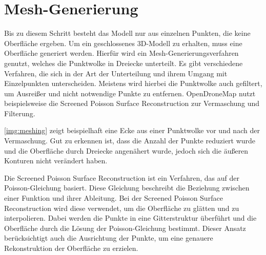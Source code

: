 \documentclass[./00PhotoBox.tex]{subfiles}
\begin{document}
\section{Mesh-Generierung}
Bis zu diesem Schritt besteht das Modell nur aus einzelnen Punkten, die keine Oberfläche ergeben. Um ein geschlossenes 3D-Modell zu erhalten, muss eine Oberfläche generiert werden. Hierfür wird ein Mesh-Generierungsverfahren genutzt, welches die Punktwolke in Dreiecke unterteilt. Es gibt verschiedene Verfahren, die sich in der Art der Unterteilung und ihrem Umgang mit Einzelpunkten unterscheiden. Meistens wird hierbei die Punktwolke auch gefiltert, um Ausreißer und nicht notwendige Punkte zu entfernen. OpenDroneMap nutzt beispielsweise die Screened Poisson Surface Reconstruction zur Vermaschung und Filterung. \citep[S. 52f]{opendronemap}

\autoref{img:meshing} zeigt beispielhaft eine Ecke aus einer Punktwolke vor und nach der Vermaschung. Gut zu erkennen ist, dass die Anzahl der Punkte reduziert wurde und die Oberfläche durch Dreiecke angenähert wurde, jedoch sich die äußeren Konturen nicht verändert haben.

Die Screened Poisson Surface Reconstruction ist ein Verfahren, das auf der Poisson-Gleichung basiert. Diese Gleichung beschreibt die Beziehung zwischen einer Funktion und ihrer Ableitung. Bei der Screened Poisson Surface Reconstruction wird diese verwendet, um die Oberfläche zu glätten und zu interpolieren. Dabei werden die Punkte in eine Gitterstruktur überführt und die Oberfläche durch die Lösung der Poisson-Gleichung bestimmt. Dieser Ansatz berücksichtigt auch die Ausrichtung der Punkte, um eine genauere Rekonstruktion der Oberfläche zu erzielen. \citep{spsr}
\end{document}

